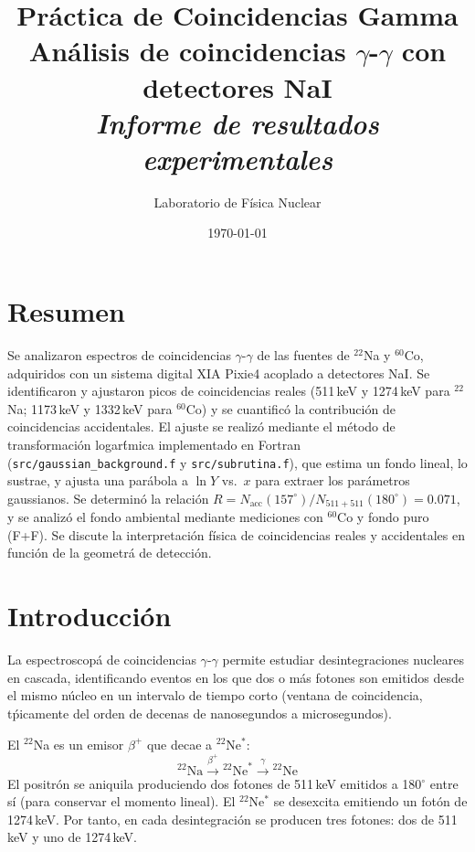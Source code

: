 \documentclass[12pt,a4paper]{article}
\title{\vspace{-1.5cm}\textbf{Pr\'actica de Coincidencias Gamma}\\
       \large An\'alisis de coincidencias $\gamma$-$\gamma$ con detectores NaI\\[0.3cm]
       \normalsize\textit{Informe de resultados experimentales}}
\author{Laboratorio de F\'isica Nuclear}
\date{\today}
\begin{document}
\maketitle
\thispagestyle{empty}

\section*{Resumen}

Se analizaron espectros de coincidencias $\gamma$-$\gamma$ de las fuentes de $^{22}$Na y $^{60}$Co,
adquiridos con un sistema digital XIA Pixie4 acoplado a detectores NaI.
Se identificaron y ajustaron picos de coincidencias reales (511\,keV y 1274\,keV para $^{22}$Na;
1173\,keV y 1332\,keV para $^{60}$Co) y se cuantific\'o la contribuci\'on de coincidencias accidentales.
El ajuste se realiz\'o mediante el m\'etodo de transformaci\'on logar\'tmica implementado en
Fortran (\texttt{src/gaussian\_background.f} y \texttt{src/subrutina.f}), que estima un fondo
lineal, lo sustrae, y ajusta una par\'abola a $\ln Y$ vs.\ $x$ para extraer los par\'ametros
gaussianos.
Se determin\'o la relaci\'on $R = N_{\text{acc}}(157^\circ)/N_{511+511}(180^\circ) = 0.071$,
y se analiz\'o el fondo ambiental mediante mediciones con $^{60}$Co y fondo puro (F+F).
Se discute la interpretaci\'on f\'isica de coincidencias reales y accidentales
en funci\'on de la geometr\'a de detecci\'on.

\newpage
\setcounter{section}{1}

\section{Introducci\'on}

La espectroscop\'a de coincidencias $\gamma$-$\gamma$ permite estudiar desintegraciones nucleares
en cascada, identificando eventos en los que dos o m\'as fotones son emitidos desde el mismo
n\'ucleo en un intervalo de tiempo corto (ventana de coincidencia, t\'picamente del orden de
decenas de nanosegundos a microsegundos).

El $^{22}$Na es un emisor $\beta^+$ que decae a $^{22}$Ne$^*$:
\begin{equation}
{}^{22}\text{Na} \xrightarrow{\beta^+} {}^{22}\text{Ne}^* \xrightarrow{\gamma} {}^{22}\text{Ne}
\end{equation}
El positr\'on se aniquila produciendo dos fotones de 511\,keV emitidos a 180$^\circ$ entre s\'i
(para conservar el momento lineal). El $^{22}$Ne$^*$ se desexcita emitiendo un fot\'on de
1274\,keV. Por tanto, en cada desintegraci\'on se producen tres fotones: dos de 511\,keV y
uno de 1274\,keV.
\end{document}
